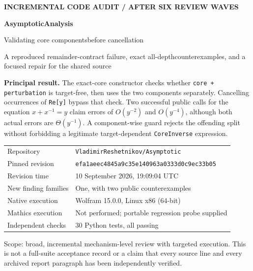 \documentclass[11pt,letterpaper]{article}
\theoremstyle{remark}\newtheorem{remark}[theorem]{Remark}
\newcommand{\code}[1]{\texttt{#1}}
\newcommand{\fullrev}{\texttt{efa1aeec4845a9c35e140963a0333d0c9ec33b05}}
\begin{document}
\begin{titlepage}
\vspace*{0.4in}
{\sffamily\bfseries\color{accent} INCREMENTAL CODE AUDIT / AFTER SIX REVIEW WAVES\par}
\vspace{0.35in}
{\sffamily\bfseries\color{ink}\fontsize{31}{36}\selectfont AsymptoticAnalysis\par}
\vspace{0.23in}
{\sffamily\fontsize{23}{29}\selectfont Validating core components\newline before cancellation\par}
\vspace{0.35in}
{\large A reproduced remainder-contract failure, exact all-depth\newline counterexamples, and a focused repair for the shared source\par}
\vspace{0.45in}
\colorbox{paper}{\parbox{0.94\textwidth}{\vspace{10pt}
\textbf{Principal result.} The exact-core constructor checks whether
\code{core + perturbation} is target-free, then uses the two components
separately. Cancelling occurrences of \code{Re[y]} bypass that check. Two
successful public calls for the equation $x+x^{-1}=y$ claim errors of
$O(y^{-2})$ and $O(y^{-4})$, although both actual errors are $\Theta(y^{-1})$.
A component-wise guard rejects the offending split without forbidding a
legitimate target-dependent \code{CoreInverse} expression.\vspace{10pt}}}
\vfill
\begin{tabular}{@{}ll@{}}
Repository & \code{VladimirReshetnikov/Asymptotic}\\
Pinned revision & \fullrev\\
Revision time & 10 September 2026, 19:09:04 UTC\\
New finding families & One, with two public counterexamples\\
Native execution & Wolfram 15.0.0, Linux x86 (64-bit)\\
Mathics execution & Not performed; portable regression probe supplied\\
Independent checks & 30 Python tests, all passing
\end{tabular}\par
\vspace{0.25in}
{\small Scope: broad, incremental mechanism-level review with targeted execution.
This is not a full-suite acceptance record or a claim that every source line
and every archived report paragraph has been independently verified.}
\end{titlepage}
\end{document}
